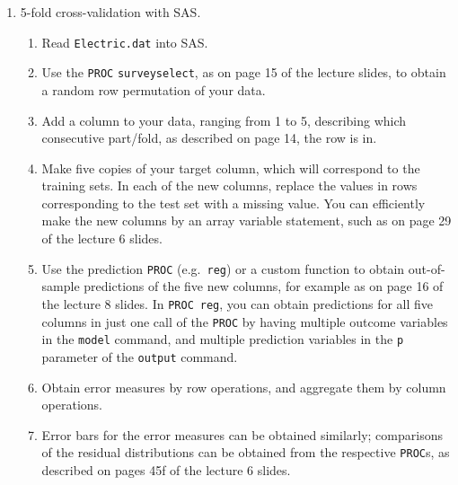 \begin{enumerate}
\item 5-fold cross-validation with SAS.
\begin{enumerate}
\item Read {\tt Electric.dat} into SAS.
\item Use the \texttt{PROC} \texttt{surveyselect}, as on page 15 of the lecture slides, to obtain a random row permutation of your data.
\item Add a column to your data, ranging from 1 to 5, describing which consecutive part/fold, as described on page 14, the row is in.
\item Make five copies of your target column, which will correspond to the training sets. In each of the new columns, replace the values in rows corresponding to the test set with a missing value. You can efficiently make the new columns by an array variable statement, such as on page 29 of the lecture 6 slides.
\item Use the prediction \texttt{PROC} (e.g.~\texttt{reg}) or a custom function to obtain out-of-sample predictions of the five new columns, for example as on page 16 of the lecture 8 slides. In \texttt{PROC}~\texttt{reg}, you can obtain predictions for all five columns in just one call of the \texttt{PROC} by having multiple outcome variables in the \texttt{model} command, and multiple prediction variables in the \texttt{p} parameter of the \texttt{output} command.
\item Obtain error measures by row operations, and aggregate them by column operations.
\item Error bars for the error measures can be obtained similarly; comparisons of the residual distributions can be obtained from the respective \texttt{PROC}s, as described on pages 45f of the lecture 6 slides.
\end{enumerate}




\end{enumerate}







